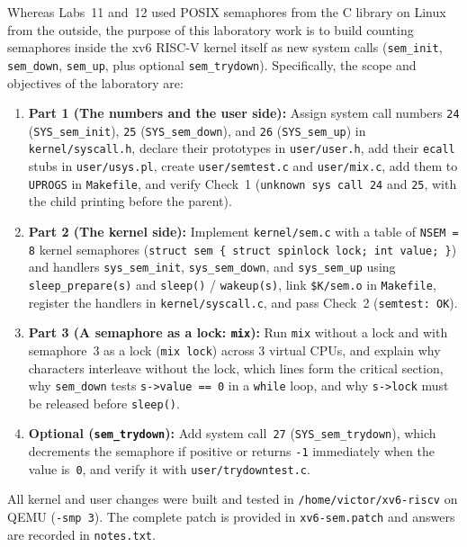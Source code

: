 \documentclass{../latex/utmreport}
\providecommand{\tightlist}{\setlength{\itemsep}{0pt}\setlength{\parskip}{0pt}}
\begin{document}
Whereas Labs~11 and~12 used POSIX semaphores from the C library on Linux from the outside, the purpose of this laboratory work is to build counting semaphores inside the xv6 RISC-V kernel itself as new system calls (\texttt{sem\_init}, \texttt{sem\_down}, \texttt{sem\_up}, plus optional \texttt{sem\_trydown}). Specifically, the scope and objectives of the laboratory are:
\begin{enumerate}
\tightlist
\item \textbf{Part 1 (The numbers and the user side):} Assign system call numbers \texttt{24} (\texttt{SYS\_sem\_init}), \texttt{25} (\texttt{SYS\_sem\_down}), and \texttt{26} (\texttt{SYS\_sem\_up}) in \texttt{kernel/syscall.h}, declare their prototypes in \texttt{user/user.h}, add their \texttt{ecall} stubs in \texttt{user/usys.pl}, create \texttt{user/semtest.c} and \texttt{user/mix.c}, add them to \texttt{UPROGS} in \texttt{Makefile}, and verify Check~1 (\texttt{unknown sys call 24} and \texttt{25}, with the child printing before the parent).
\item \textbf{Part 2 (The kernel side):} Implement \texttt{kernel/sem.c} with a table of \texttt{NSEM = 8} kernel semaphores (\texttt{struct sem \{ struct spinlock lock; int value; \}}) and handlers \texttt{sys\_sem\_init}, \texttt{sys\_sem\_down}, and \texttt{sys\_sem\_up} using \texttt{sleep\_prepare(s)} and \texttt{sleep()} / \texttt{wakeup(s)}, link \texttt{\$K/sem.o} in \texttt{Makefile}, register the handlers in \texttt{kernel/syscall.c}, and pass Check~2 (\texttt{semtest: OK}).
\item \textbf{Part 3 (A semaphore as a lock: \texttt{mix}):} Run \texttt{mix} without a lock and with semaphore~3 as a lock (\texttt{mix lock}) across 3 virtual CPUs, and explain why characters interleave without the lock, which lines form the critical section, why \texttt{sem\_down} tests \texttt{s->value == 0} in a \texttt{while} loop, and why \texttt{s->lock} must be released before \texttt{sleep()}.
\item \textbf{Optional (\texttt{sem\_trydown}):} Add system call~\texttt{27} (\texttt{SYS\_sem\_trydown}), which decrements the semaphore if positive or returns \texttt{-1} immediately when the value is~\texttt{0}, and verify it with \texttt{user/trydowntest.c}.
\end{enumerate}

All kernel and user changes were built and tested in \texttt{/home/victor/xv6-riscv} on QEMU (\texttt{-smp 3}). The complete patch is provided in \texttt{xv6-sem.patch} and answers are recorded in \texttt{notes.txt}.
\end{document}
